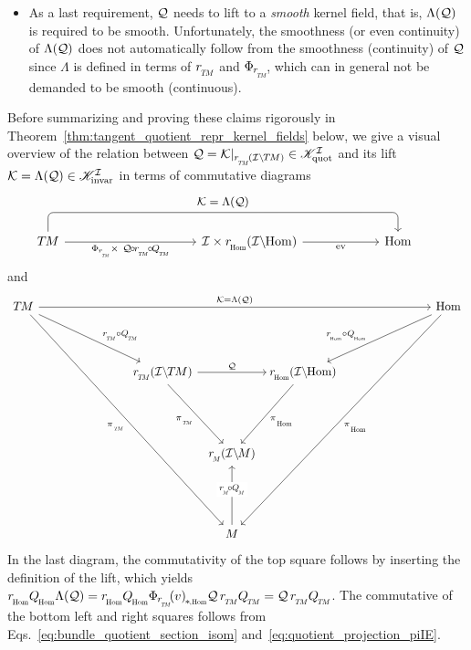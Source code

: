 \begin{itemize}[leftmargin=0.6cm]
\item[{\rule[2.4pt]{2pt}{2pt}}]
As a last requirement, $\mathcal{Q}$ needs to lift to a \emph{smooth} kernel field, that is, $\Lambda(\mathcal{Q})$ is required to be smooth.
Unfortunately, the smoothness (or even continuity) of $\Lambda(\mathcal{Q})$ does not automatically follow from the smoothness (continuity) of $\mathcal{Q}$ since $\Lambda$ is defined in terms of $\rTM$ and $\PhirNoArg$, which can in general not be demanded to be smooth (continuous).

\end{itemize}


Before summarizing and proving these claims rigorously in Theorem~\ref{thm:tangent_quotient_repr_kernel_fields} below, we give a visual overview of the relation between $\Q = \Krestr \in \KIquot$ and its lift $\mathcal{K} = \Lambda(\mathcal{Q}) \in \mathscr{K}_\textup{invar}^{\mathcal{I}}$ in terms of commutative diagrams
\begin{equation}
    \begin{tikzcd}[row sep=3.5em, column sep=6em]
        \TM
            \arrow[r, "\PhirNoArg \,\times\ \Q \mkern-2mu\circ\mkern-2mu \rTM \mkern-2mu\circ\mkern-2mu \QTM"']
            \arrow[rr, rounded corners, to path={ 
                    -- ([yshift=+3.5ex]\tikztostart.north) 
                    --node[above, pos=.5]{\small$\K = \Lambda(\Q)$} ([yshift=+3.5ex]\tikztotarget.north) 
                    -- (\tikztotarget.north)
                    }]
        &[10ex]
        \I \times \rHom(\IHom)
            \arrow[r, "\ev"']
        & \Hom
    \end{tikzcd}
    \qquad
\end{equation}
and
\begin{equation}
    \begin{tikzcd}[row sep=5em, column sep=7.5em]
        \TM
            \arrow[rd, pos=.6, "\rTM\circ\QTM"]
            \arrow[rrddd, "\piTM"']
            \arrow[rrrr, "\K = \Lambda(\Q)"]
        & &[-7em] &[-7em] &
        \Hom
            \arrow[ld, pos=.6, "\rHom\circ\QHom"']
            \arrow[llddd, "\piHom"]
        \\[-1em]
        & \rTM(\ITM)
            \arrow[rr, "\Q"]
            \arrow[rd, start anchor={[xshift=-1ex]}, "\piTM"']
        & &
        \mkern-3mu
        \rHom(\IHom)
            \arrow[ld, "\piHom"]
        \\
        & &
        \rM(\IM)
        \\
        & &
        M
            \arrow[u, pos=.6, "\rM \!\circ\mkern-1mu \QM"' description]
    \end{tikzcd}
\end{equation}
In the last diagram, the commutativity of the top square follows by inserting the definition of the lift, which yields
$\rHom\QHom \Lambda(\Q) = \rHom\QHom \dPhirHom{v} \Q\, \rTM\QTM = \Q\, \rTM\QTM$.
The commutative of the bottom left and right squares follows from Eqs.~\ref{eq:bundle_quotient_section_isom} and~\ref{eq:quotient_projection_piIE}.


